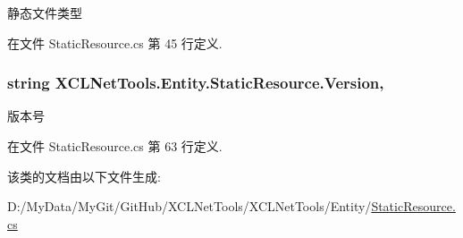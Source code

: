 静态文件类型 



在文件 Static\-Resource.\-cs 第 45 行定义.

\hypertarget{class_x_c_l_net_tools_1_1_entity_1_1_static_resource_a4b85a7d2f6dc6169a10ebfe2987f2404}{
\subsubsection[{Version}]{\setlength{\rightskip}{0pt plus 5cm}string X\-C\-L\-Net\-Tools.\-Entity.\-Static\-Resource.\-Version\hspace{0.3cm}{\ttfamily [get]}, {\ttfamily [set]}}}\label{class_x_c_l_net_tools_1_1_entity_1_1_static_resource_a4b85a7d2f6dc6169a10ebfe2987f2404}


版本号 



在文件 Static\-Resource.\-cs 第 63 行定义.



该类的文档由以下文件生成\-:\begin{DoxyCompactItemize}
\item 
D\-:/\-My\-Data/\-My\-Git/\-Git\-Hub/\-X\-C\-L\-Net\-Tools/\-X\-C\-L\-Net\-Tools/\-Entity/\hyperlink{_static_resource_8cs}{Static\-Resource.\-cs}\end{DoxyCompactItemize}
